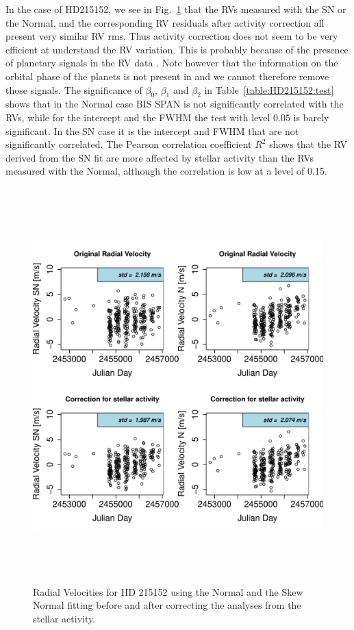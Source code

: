 \documentclass[11pt, oneside]{article}
\begin{document}
In the case of HD215152, we see in Fig.~\ref{fig:HD215152:correctionRV} that the RVs measured with the SN or the Normal, and the corresponding RV residuals after activity correction all present very similar RV rms. Thus activity correction does not seem to be very efficient at understand the RV variation. This is probably because of the presence of planetary signals in the RV data \citep[][]{Mayor-2011}. Note however that the information on the orbital phase of the planets is not present in \citet{Mayor-2011} and we cannot therefore remove those signals. The significance of $\beta_{0}$, $\beta_{1}$ and $\beta_{2}$ in Table~\ref{table:HD215152:test} shows that in the Normal case BIS SPAN is not significantly correlated with the RVs, while for the intercept and the FWHM the test with level $0.05$ is barely significant. In the SN case it is the intercept and FWHM that are not significantly correlated. The Pearson correlation coefficient $R^2$ shows that the RV derived from the SN fit are more affected by stellar activity than the RVs measured with the Normal, although the correlation is low at a level of 0.15.
%
\begin{figure}[htbp]
   \centering
\includegraphics[height = 6in]{HD21515_[3]CorrectionActivity_RadialVelocity_vs_time.pdf} 
   \caption{Radial Velocities for HD 215152 using the Normal and the Skew Normal fitting before and after correcting the analyses from the stellar activity.}
   \label{fig:HD215152:correctionRV}
\end{figure}
\end{document}
